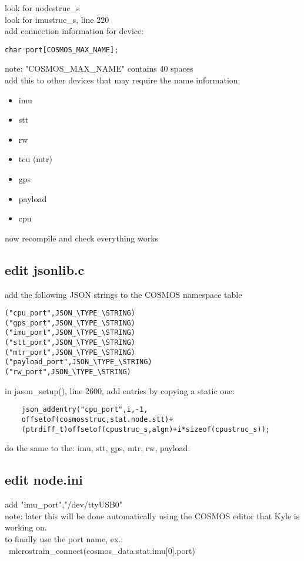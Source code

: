 look for nodestruc\_s \\
look for imustruc\_s, line 220 \\
add connection information for device:
\begin{lstlisting}
char port[COSMOS_MAX_NAME];
\end{lstlisting}
note: "COSMOS\_MAX\_NAME" contains 40 spaces \\
add this to other devices that may require the name information:
\begin{itemize}
\item imu
\item stt
\item rw
\item tcu (mtr)
\item gps
\item payload
\item cpu
\end{itemize}

now recompile and check everything works
\subsection{edit jsonlib.c}
add the following JSON strings to the COSMOS namespace table
\begin{lstlisting}
("cpu_port",JSON_\TYPE_\STRING)
("gps_port",JSON_\TYPE_\STRING)
("imu_port",JSON_\TYPE_\STRING)
("stt_port",JSON_\TYPE_\STRING)
("mtr_port",JSON_\TYPE_\STRING)
("payload_port",JSON_\TYPE_\STRING)
("rw_port",JSON_\TYPE_\STRING)
\end{lstlisting}

in jason\_setup(), line 2600, add entries by copying a static one:
\begin{lstlisting}
    json_addentry("cpu_port",i,-1,
    offsetof(cosmosstruc,stat.node.stt)+
    (ptrdiff_t)offsetof(cpustruc_s,algn)+i*sizeof(cpustruc_s));
\end{lstlisting}

do the same to the: imu, stt, gps, mtr, rw, payload.

\subsection{edit node.ini}
add {"imu\_port","/dev/ttyUSB0"} \\
note: later this will be done automatically using the COSMOS editor that Kyle is working on.\\
to finally use the port name, ex.: \ microstrain\_connect(cosmos\_data.stat.imu[0].port)\\


